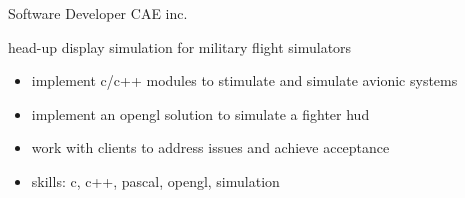 \documentclass[print]{friggeri-cv}
\begin{document}
\begin{entrylist}



  {Software Developer} {\scriptsize{CAE} inc.}
  {head-up display simulation for military flight simulators
  \begin{itemize}
    \item implement c/c++ modules to stimulate and simulate avionic systems
    \item implement an opengl solution to simulate a fighter hud
    \item work with clients to address issues and achieve acceptance
    \item skills: c, c++, pascal, opengl, simulation
  \end{itemize}
  }


\end{entrylist}
\end{document}
